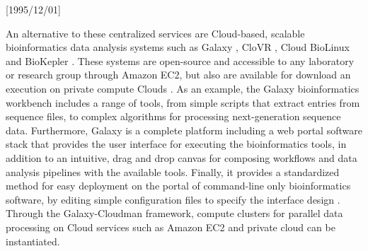 \NeedsTeXFormat{LaTeX2e}[1995/12/01] \documentclass[10pt]{bmc_article}
\newenvironment{bmcformat}{\begin{raggedright}\baselineskip20pt\sloppy\setboolean{publ}{false}}{\end{raggedright}\baselineskip20pt\sloppy}
\begin{document}
\begin{bmcformat}
An alternative to these centralized services are Cloud-based, scalable bioinformatics data analysis systems such as Galaxy
\cite{Goecks2010}, CloVR \cite{Angiuoli2011}, Cloud BioLinux \cite{Krampis2012} and BioKepler \cite{Altintas2011}. 
These systems are open-source and accessible to any laboratory or research group through Amazon EC2, but also are 
available for download an execution on private compute Clouds \cite{awsec2}. As an example, the Galaxy bioinformatics 
workbench includes a range of tools, from simple scripts that extract entries from sequence files, to complex algorithms 
for processing next-generation sequence data. Furthermore, Galaxy is a complete platform including a web portal software 
stack that provides the user interface for  executing the bioinformatics tools, in addition to an intuitive, drag and drop
canvas for composing  workflows and data analysis pipelines with the available tools. Finally, it provides a standardized 
method for easy deployment on the portal of command-line only bioinformatics software, by editing simple configuration 
files to specify the interface design \cite{galaxywiki}.  Through the Galaxy-Cloudman \cite{Afgan2010} 
framework, compute clusters for parallel data processing on Cloud services such as Amazon EC2 and private cloud can
be instantiated. \pb


\end{bmcformat}
\end{document}
